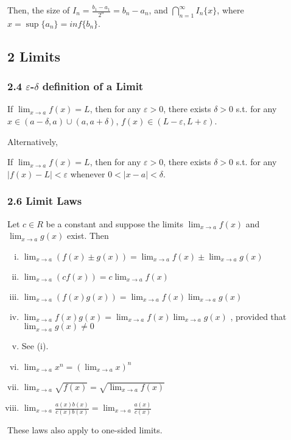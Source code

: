 Then, the size of $I_n = \frac{b_1 - a_1}{2^n} = b_n - a_n$, and $\displaystyle \bigcap_{n=1}^{\infty}I_n \{x\}$, where $x = \sup \{a_n\} = inf \{ b_n \}$.

\subsection*{2 Limits}

\subsubsection*{2.4 $\varepsilon$-$\delta$ definition of a Limit}

\begin{definition}[Limit]
  If $\displaystyle\lim_{x \to a} f(x) = L$, then for any $\varepsilon > 0$, there exists $\delta > 0$ s.t. for any $x \in (a - \delta, a) \cup (a, a + \delta)$, $f(x) \in (L - \varepsilon, L + \varepsilon)$.
\end{definition}

Alternatively,

\begin{definition}[Limit]
  If $\displaystyle\lim_{x \to a} f(x) = L$, then for any $\varepsilon > 0$, there exists $\delta > 0$ s.t. for any $| f (x) - L| < \varepsilon$ whenever $0 < |x - a| < \delta$.
\end{definition}

\subsubsection*{2.6 Limit Laws}

\begin{theorem}
  Let $c \in R$ be a constant and suppose the limits $\lim_{x \to a} f (x)$ and $\lim_{x \to a} g (x)$ exist. Then
  \begin{enumerate}[(i)]
  \item $\displaystyle\lim_{x \to a}( f (x) \pm g(x)) = \lim_{x \to a} f (x) \pm \lim_{x \to a} g(x)$
  \item $\displaystyle\lim_{x \to a}(c f (x)) = c \lim_{x \to a} f (x)$
  \item $\displaystyle\lim_{x \to a}( f (x)g(x)) = \lim_{x \to a} f (x) \lim_{x \to a} g(x)$
  \item $\displaystyle\lim_{x \to a} f (x) g(x) = \lim_{x \to a} f (x) \lim_{x \to a} g(x)$ , provided that $\displaystyle\lim_{x \to a} g(x) \neq 0$
  \item See (i).
  \item $\displaystyle\lim_{x \to a} x^n = (\lim_{x \to a} x)^n$
  \item $\displaystyle\lim_{x \to a} \sqrt{f(x)} = \sqrt{\lim_{x \to a} f(x)}$
  \item $\displaystyle\lim_{x \to a} \frac{a(x)b(x)}{c(x)b(x)} = \lim_{x \to a} \frac{a(x)}{c(x)}$
  \end{enumerate}
  These laws also apply to one-sided limits.
\end{theorem}


